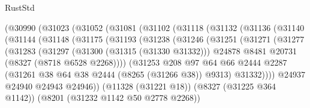 \begin{lexlean}{RustStd}
\begin{coremodule}
{\begin{coremodule}
{{{{{{{{{{{{{{{{{{{{{{{{{{{{{{{{{{{{{{{{{{{{{{{{{{{{{{                  (@30990
                    (@31023
                      (@31052
                        (@31081
                          (@31102
                            (@31118
                              (@31132
                                (@31136
                                  (@31140
                                    (@31144
                                      (@31148
                                        (@31175
                                          (@31193
                                            (@31238
                                              (@31246
                                                (@31251
                                                  (@31271
                                                    (@31277
                                                      (@31283
                                                        (@31297
                                                          (@31300 (@31315 (@31330 @31332)))
                                                          @24878
                                                          @8481
                                                          @20731
                                                          (@8327 (@8718 @6528 @2268))))
                                                      (@31253
                                                        @208
                                                        @97
                                                        @64
                                                        @66
                                                        @2444
                                                        @2287
                                                        (@31261
                                                          @38
                                                          @64
                                                          @38
                                                          @2444
                                                          (@8265 (@31266 @38))
                                                          @9313)
                                                        @31332))))
                                                @24937
                                                @24940
                                                @24943
                                                @24946))
                                            (@11328 (@31221 @18))
                                            (@8327 (@31225 @364 @1142))
                                            (@8201 (@31232 @1142 @50 @2778 @2268))
}}}}}}}}}}}}}}}}}}}}}}}}}}}}}}}}}}}}}}}}}}}}}}}}}}}}}}
\end{coremodule}}
\end{coremodule}
\end{lexlean}
